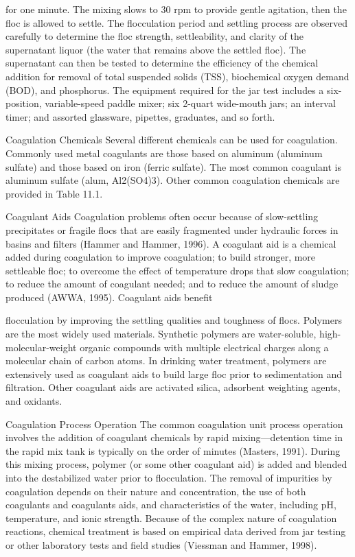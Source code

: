 \documentclass{article}
\begin{document}
for one minute. The mixing slows to 30 rpm to provide gentle agitation,
then the floc is allowed to settle. The flocculation period and settling
process are observed carefully to determine the floc strength,
settleability, and clarity of the supernatant liquor (the water that
remains above the settled floc). The supernatant can then be tested to
determine the efficiency of the chemical addition for removal of total
suspended solids (TSS), biochemical oxygen demand (BOD), and phosphorus.
The equipment required for the jar test includes a six-position,
variable-speed paddle mixer; six 2-quart wide-mouth jars; an interval
timer; and assorted glassware, pipettes, graduates, and so forth.

Coagulation Chemicals Several different chemicals can be used for
coagulation. Commonly used metal coagulants are those based on aluminum
(aluminum sulfate) and those based on iron (ferric sulfate). The most
common coagulant is aluminum sulfate (alum, Al2(SO4)3). Other common
coagulation chemicals are provided in Table 11.1.

Coagulant Aids Coagulation problems often occur because of slow-settling
precipitates or fragile flocs that are easily fragmented under hydraulic
forces in basins and filters (Hammer and Hammer, 1996). A coagulant aid
is a chemical added during coagulation to improve coagulation; to build
stronger, more settleable floc; to overcome the effect of temperature
drops that slow coagulation; to reduce the amount of coagulant needed;
and to reduce the amount of sludge produced (AWWA, 1995). Coagulant aids
benefit

flocculation by improving the settling qualities and toughness of flocs.
Polymers are the most widely used materials. Synthetic polymers are
water-soluble, high-molecular-weight organic compounds with multiple
electrical charges along a molecular chain of carbon atoms. In drinking
water treatment, polymers are extensively used as coagulant aids to
build large floc prior to sedimentation and filtration. Other coagulant
aids are activated silica, adsorbent weighting agents, and oxidants.

Coagulation Process Operation The common coagulation unit process
operation involves the addition of coagulant chemicals by rapid
mixing---detention time in the rapid mix tank is typically on the order
of minutes (Masters, 1991). During this mixing process, polymer (or some
other coagulant aid) is added and blended into the destabilized water
prior to flocculation. The removal of impurities by coagulation depends
on their nature and concentration, the use of both coagulants and
coagulants aids, and characteristics of the water, including pH,
temperature, and ionic strength. Because of the complex nature of
coagulation reactions, chemical treatment is based on empirical data
derived from jar testing or other laboratory tests and field studies
(Viessman and Hammer, 1998).
\end{document}

